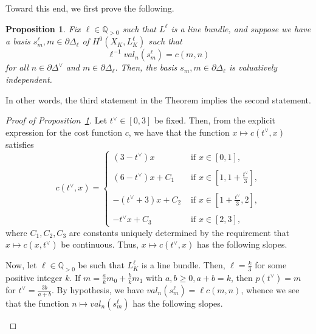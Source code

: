 \documentclass{article}
\newcommand{\QQ}{\mathbb{Q}}
\newtheorem{prop}{Proposition}
\begin{document}
Toward this end, we first prove the following. 
\begin{prop}\label{prop:HessianCostisValuative} Fix $\ell \in\QQ_{>0}$ such that $L^\ell$ is a line bundle, and suppose we have a basis $s^\ell_m, m\in\partial\Delta_\ell$ of $H^0(X_K,L^\ell_K)$ such that 
\[\ell^{-1}val_n(s^\ell_m)= c(m,n)
\]
for all $n\in\partial\Delta^\vee$ and $m\in\partial\Delta_\ell$. Then, the basis $s_m,m\in \partial\Delta_\ell$ is valuatively independent. 
\end{prop}
In other words, the third statement in the Theorem implies the second statement. 
\begin{proof}[Proof of Proposition~\ref{prop:HessianCostisValuative}]
    Let $t^\vee \in[0,3]$ be fixed. Then, from the explicit expression for the cost function $c$, we have that the function $x\mapsto c(t^\vee,x)$ satisfies
    \[
    c(t^\vee,x) = 
    \begin{cases}
        (3-t^\vee)x & \textrm{ if } x\in[0,1],\\
        \\
        (6-t^\vee)x + C_1 & \textrm{ if } x\in [1,1+\frac{t^\vee}{3}],\\
        \\
        -(t^\vee+3)x + C_2 & \textrm{ if } x\in[1+\frac{t^\vee}{3},2],\\
        \\
        -t^\vee x +C_3& \textrm{ if } x\in[2,3],
    \end{cases}
    \]
    where $C_1,C_2,C_3$ are constants uniquely determined by the requirement that $x\mapsto c(x,t^\vee)$ be continuous. Thus, $x\mapsto c(t^\vee,x)$ has the following slopes.
    \begin{center}
\end{center}
Now, let $\ell \in \QQ_{>0}$ be such that $L^\ell_K$ is a line bundle. Then, $\ell = \frac{k}{3}$ for some positive integer $k$. If $m = \frac{a}{k}m_0+\frac{b}{k}m_1$ with $a,b\geq 0,a+b=k$, then $p(t^\vee) = m$ for $t^\vee = \frac{3b}{a+b}$. By hypothesis, we have $val_n(s^\ell_m) = \ell c(m,n)$, whence we see that the function $n\mapsto val_n(s^\ell_m)$ has the following slopes.
\begin{center}
    \begin{tikzpicture}[domain=0:9]
    

\end{tikzpicture}
\end{center}
\end{proof}
\end{document}
